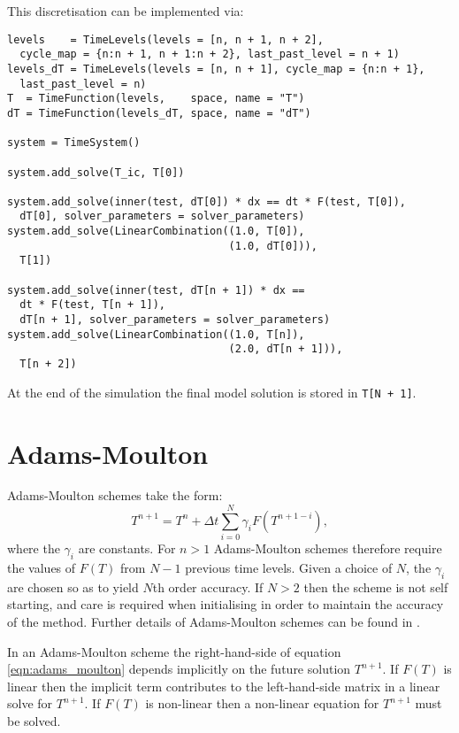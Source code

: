\documentclass[a4paper]{book}
\begin{document}
This discretisation can be implemented via:
\begin{lstlisting}
levels    = TimeLevels(levels = [n, n + 1, n + 2],
  cycle_map = {n:n + 1, n + 1:n + 2}, last_past_level = n + 1)
levels_dT = TimeLevels(levels = [n, n + 1], cycle_map = {n:n + 1},
  last_past_level = n)
T  = TimeFunction(levels,    space, name = "T")
dT = TimeFunction(levels_dT, space, name = "dT")

system = TimeSystem()

system.add_solve(T_ic, T[0])

system.add_solve(inner(test, dT[0]) * dx == dt * F(test, T[0]),
  dT[0], solver_parameters = solver_parameters)
system.add_solve(LinearCombination((1.0, T[0]),
                                   (1.0, dT[0])),
  T[1])

system.add_solve(inner(test, dT[n + 1]) * dx ==
  dt * F(test, T[n + 1]),
  dT[n + 1], solver_parameters = solver_parameters)
system.add_solve(LinearCombination((1.0, T[n]),
                                   (2.0, dT[n + 1])),
  T[n + 2])
\end{lstlisting}
At the end of the simulation the final model solution is stored in
\verb=T[N + 1]=.

\section{Adams-Moulton}

Adams-Moulton schemes take the form:
\begin{equation}\label{eqn:adams_moulton}
  T^{n + 1} = T^n + \Delta t \sum_{i = 0}^N \gamma_i F( T^{n + 1 - i}),
\end{equation}
where the $\gamma_i$ are constants. For $n > 1$ Adams-Moulton schemes therefore
require the values of $F(T)$ from $N - 1$ previous time levels. Given a choice
of $N$, the $\gamma_i$ are chosen so as to yield $N$th order accuracy. If
$N > 2$ then the scheme is not self starting, and care is required when
initialising in order to maintain the accuracy of the method. Further details of
Adams-Moulton schemes can be found in \citet[section III.1]{hairer1987}.

In an Adams-Moulton scheme the right-hand-side of equation
\eqref{eqn:adams_moulton} depends implicitly on the future solution $T^{n + 1}$.
If $F(T)$ is linear then the implicit term contributes to the left-hand-side
matrix in a linear solve for $T^{n + 1}$. If $F(T)$ is non-linear then
a non-linear equation for $T^{n + 1}$ must be solved.
\end{document}
